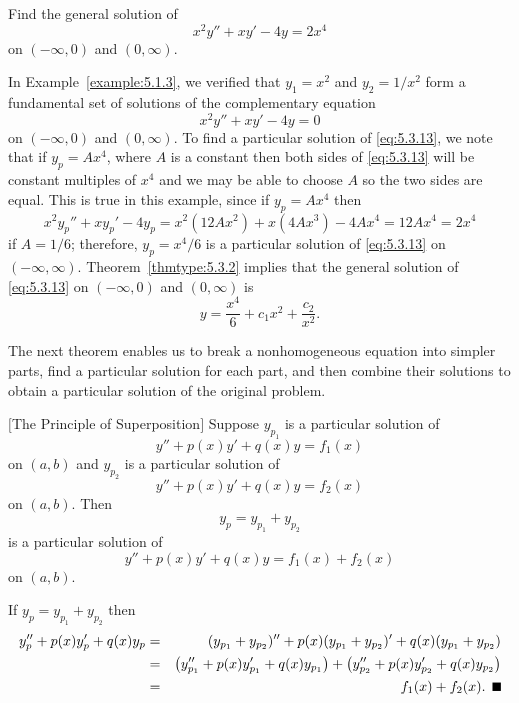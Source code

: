 \begin{example}
  \label{example:5.3.3} \rm Find the general solution of
  \begin{equation}
    \label{eq:5.3.13}x^{2}y''+xy'-4y=2x^{4}
  \end{equation}
  on $(-\infty,0)$ and $(0,\infty)$.
\end{example}

\begin{examplesolution}
\solution In Example~\ref{example:5.1.3}, we verified that $y_{1}=x^{2}$ and $y_{2}=1/x^{2}$ form a
fundamental set of solutions of the complementary equation
\[
  x^{2}y''+xy'-4y=0
\]
on $(-\infty,0)$ and $(0,\infty)$. To find a particular solution of \eqref{eq:5.3.13}, we note that
if $y_{p}=Ax^{4}$, where $A$ is a constant then both sides of \eqref{eq:5.3.13} will be constant
multiples of $x^{4}$ and we may be able to choose $A$ so the two sides are equal. This is true in
this example, since if $y_{p}=Ax^{4}$ then
\[
  x^{2}y_{p}''+xy_{p}'-4y_{p}=x^{2}(12Ax^{2})+x(4Ax^{3})-4Ax^{4}=12Ax^{4}=2x^{4}
\]
if $A=1/6$; therefore, $y_{p}=x^{4}/6$ is a particular solution of \eqref{eq:5.3.13} on
$(-\infty,\infty)$. Theorem~\ref{thmtype:5.3.2} implies that the general solution of
\eqref{eq:5.3.13} on $(-\infty,0)$ and $(0,\infty)$ is
\[
  y=\frac{x^{4}}{6}+c_{1}x^{2}+\frac{c_{2}}{x^{2}}.
\]
\end{examplesolution}


\noindent
The next theorem enables us to break a nonhomogeneous equation into simpler parts, find a particular
solution for each part, and then combine their solutions to obtain a particular solution of the
original problem.

\begin{theorem}
  \color{blue}
  $[$The Principle of Superposition$]$ \label{thmtype:5.3.3} Suppose $y_{p_{1}}$ is a particular
  solution of
  \[
    y''+p(x)y'+q(x)y=f_{1}(x)
  \]
  on $(a,b)$ and $y_{p_{2}}$ is a particular solution of
  \[
    y''+p(x)y'+q(x)y=f_{2}(x)
  \]
  on $(a,b)$. Then
  \[
    y_{p}=y_{p_{1}}+y_{p_{2}}
  \]
  is a particular solution of
  \[
    y''+p(x)y'+q(x)y=f_{1}(x)+f_{2}(x)
  \]
  on $(a,b)$.
\end{theorem}

\proof If $y_{p}=y_{p_{1}}+y_{p_{2}}$ then
\begin{eqnarray*}
  y_{p}''+p(x)y_{p}'+q(x)y_{p} & = & (y_{p_{1}}+y_{p_{2}})''+p(x)(y_{p_{1}}+y_{p_{2}})'+q(x)(y_{p_{1}}+y_{p_{2}})                                \\
                               & = & \left(y_{p_{1}}''+p(x)y_{p_{1}}'+q(x)y_{p_{1}}\right)+\left(y_{p_{2}}''+p(x)y_{p_{2}}'+q(x)y_{p_{2}}\right) \\
                               & = & f_{1}(x)+f_{2}(x).\bbox
\end{eqnarray*}

